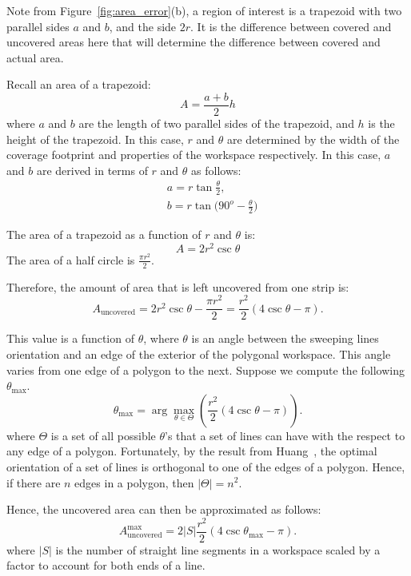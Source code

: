 \documentclass[../main.tex]{subfiles}
\begin{document}
Note from Figure~\ref{fig:area_error}(b), a region of interest is a trapezoid with two parallel sides $a$ and $b$, and the side $2r$. It is the difference between covered and uncovered areas here that will determine the difference between covered and actual area.

Recall an area of a trapezoid:
\begin{equation}
	A=\frac{a+b}{2}h
\end{equation}
where $a$ and $b$ are the length of two parallel sides of the trapezoid, and $h$ is the height of the trapezoid. In this case, $r$ and $\theta$ are determined by the width of the coverage footprint and properties of the workspace respectively. In this case, $a$ and $b$ are derived in terms of $r$ and $\theta$ as follows:
\begin{equation}
	\begin{aligned}
		&a=r\tan{\frac{\theta}{2}},\\
		&b=r\tan{(90^o-\frac{\theta}{2}})
	\end{aligned}
\end{equation}

The area of a trapezoid as a function of $r$ and $\theta$ is:
\begin{equation}
	A=2r^2\csc{\theta}
\end{equation}
The area of a half circle is $\frac{\pi r^2}{2}$.

Therefore, the amount of area that is left uncovered from one strip is:
\begin{equation}
	A_{\text{uncovered}}=2r^2\csc\theta-\frac{\pi r^2}{2}=\frac{r^2}{2}(4\csc\theta-\pi).
\end{equation}

This value is a function of $\theta$, where $\theta$ is an angle between the sweeping lines orientation and an edge of the exterior of the polygonal workspace. This angle varies from one edge of a polygon to the next. Suppose we compute the following $\theta_{\max}$.
\begin{equation}
	\theta_{\max}=\arg\max_{\theta\in\Theta}(\frac{r^2}{2}(4\csc\theta-\pi)).
\end{equation}%
where $\Theta$ is a set of all possible $\theta$'s that a set of lines can have with the respect to any edge of a polygon. Fortunately, by the result from Huang~\cite{Huang2001optimal}, the optimal orientation of a set of lines is orthogonal to one of the edges of a polygon. Hence, if there are $n$ edges in a polygon, then $|\Theta|=n^2$.

Hence, the uncovered area can then be approximated as follows:
\begin{equation}
	A_{\text{uncovered}}^{\max}=2|S|\frac{r^2}{2}(4\csc\theta_{\max}-\pi).
\end{equation}%
where $|S|$ is the number of straight line segments in a workspace scaled by a factor to account for both ends of a line.
\end{document}
